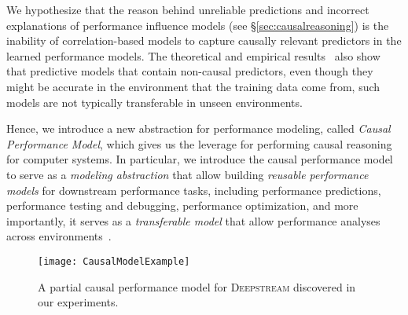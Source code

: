 



We hypothesize that the reason behind unreliable predictions and incorrect explanations of performance influence models (see \S\ref{sec:causalreasoning}) is the inability of correlation-based models to capture causally relevant predictors in the learned performance models. The theoretical and empirical results~\cite{JSVKPA:ASE17,javidian2019transfer} also show that predictive models that contain non-causal predictors, even though they might be accurate in the environment that the training data come from, such models are not typically transferable in unseen environments.

Hence, we introduce a new abstraction for performance modeling, called \emph{Causal Performance Model}, which gives us the leverage for performing causal reasoning for computer systems. In particular, we introduce the causal performance model to serve as a \emph{modeling abstraction} that allow building \emph{reusable performance models} for downstream performance tasks, including performance predictions, performance testing and debugging, performance optimization, and more importantly, it serves as a \emph{transferable model} that allow performance analyses across environments~\cite{JSVKPA:ASE17,javidian2019transfer}.

\begin{figure}[tp!]
    \centering
    \texttt{[image: CausalModelExample]}
    \caption{\small {A partial causal performance model for \textsc{Deepstream} discovered in our experiments. %
    }}
    
    \label{fig:causal_model_example}
    \vspace{-3mm}
\end{figure}

